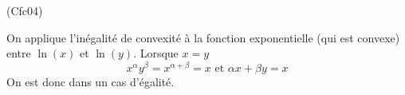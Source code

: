 \begin{tiny}(Cfc04)\end{tiny} On applique l'inégalité de convexité à la fonction exponentielle (qui est convexe) entre $\ln(x)$ et $\ln(y)$. Lorsque $x=y$
\begin{displaymath}
 x^\alpha y^\beta=x^{\alpha + \beta}=x\text{ et }
\alpha x +\beta y = x
\end{displaymath}
 On est donc dans un cas d'égalité.